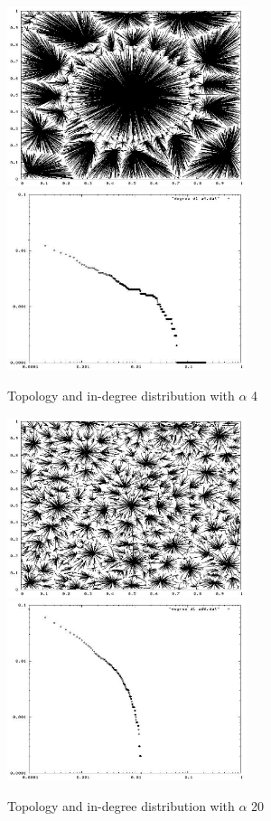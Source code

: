 \documentclass[a4paper,11pt]{article}
\begin{document}
\begin{figure}
\begin{center}
\includegraphics[width=7cm]{pic_alfa4.eps}\hfill
\includegraphics[width=7cm]{picdegree_alfa4.eps}
\end{center}
\caption{Topology and in-degree distribution with $\alpha$ 4\label{t4figure}}
\end{figure}

\begin{figure}
\begin{center}
\includegraphics[width=7cm]{pic_alfa20.eps}\hfill
\includegraphics[width=7cm]{picdegree_alfa20.eps}
\end{center}
\caption{Topology and in-degree distribution with $\alpha$ 20\label{t20figure}}
\end{figure}
\end{document}
